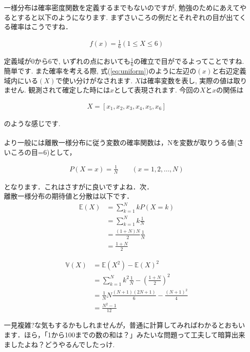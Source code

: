 \documentclass[11pt,a4paper,uplatex]{ujreport} 	%
\begin{document}
一様分布は確率密度関数を定義するまでもないのですが, 勉強のためにあえてやるとすると以下のようになります. まずさいころの例だとそれぞれの目が出てくる確率はこうですね．

\begin{align}
\label{eq:uniform}
f(x) = \frac{1}{6} (1 \leq X \leq 6)
\end{align}

定義域が0から6で, いずれの点においても$\frac{1}{6}$の確立で目がでるよってことですね. 簡単です. また確率を考える際, 式(\ref{eq:uniform})のように左辺の$(x)$と右辺定義域内にいる$(X)$で使い分けがなされます. $X$は確率変数を表し, 実際の値は取りません. 観測されて確定した時には$x$として表現されます. 今回の$X$と$x$の関係は

\begin{align}
X = [x_1, x_2, x_3, x_4, x_5, x_6]
\end{align}

のような感じです. \\
\\

より一般には離散一様分布に従う変数の確率関数は，Nを変数が取りうる値(さいころの目=6)として，

\begin{align}
P(X=x) = \frac{1}{N} \qquad (x=1,2,...,N)
\end{align}

となります．これはさすがに良いですよね．次．\\

離散一様分布の期待値と分散は以下です．\\

\begin{align}
\mathbb{E}(X) &= \sum_{k=1}^N{kP(X=k)}\\
&=\sum_{k=1}^N{k\frac{1}{N}}\\
&= \frac{(1+N)N}{2}\frac{1}{N}\\
&= \frac{1+N}{2}
\end{align}

\begin{align}
\mathbb{V}(X) &= \mathbb{E}(X^2) - \mathbb{E}(X)^2\\
&= \sum_{k=1}^N k^2 \frac{1}{N} - {(\frac{1+N}{2})}^2\\
&= \frac{1}{N}N\frac{(N+1)(2N+1)}{6}-\frac{(N+1)^2}{4}\\
&= \frac{N^2-1}{12}
\end{align}

一見複雑?な気もするかもしれませんが，普通に計算してみればわかるとおもいます．ほら，「1から100までの数の和は？」みたいな問題って工夫して暗算出来ましたよね？どうやるんでしたっけ.\\
\\
\end{document}
